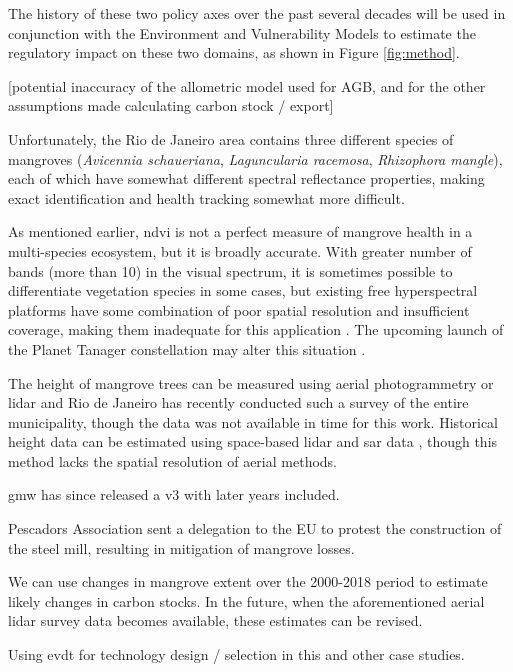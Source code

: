 The history of these two policy axes over the past several decades will be used in conjunction with the Environment and Vulnerability Models to estimate the regulatory impact on these two domains, as shown in Figure \ref{fig:method}.

[potential inaccuracy of the allometric model used for AGB, and for the other assumptions made calculating carbon stock / export]


Unfortunately, the Rio de Janeiro area contains three different species of mangroves (\textit{Avicennia schaueriana}, \textit{Laguncularia racemosa}, \textit{Rhizophora mangle}), each of which have somewhat different spectral reflectance properties, making exact identification and health tracking somewhat more difficult.

As mentioned earlier, \ac{ndvi} is not a perfect measure of mangrove health in a multi-species ecosystem, but it is broadly accurate. With greater number of bands (more than 10) in the visual spectrum, it is sometimes possible to differentiate vegetation species in some cases, but existing free hyperspectral platforms have some combination of poor spatial resolution and insufficient coverage, making them inadequate for this application \cite{mousivandGlobalSensitivityAnalysis2014}. The upcoming launch of the Planet Tanager constellation may alter this situation \cite{planetlabspbcPlanetAnnouncesNew2022}.

The height of mangrove trees can be measured using aerial photogrammetry or \ac{lidar} \cite{olagokeIndividualMangroveTree2015} and Rio de Janeiro has recently conducted such a survey of the entire municipality, though the data was not available in time for this work. Historical height data can be estimated using space-based \ac{lidar} and \ac{sar} data \cite{lagomasinoComparisonMangroveCanopy2016}, though this method lacks the spatial resolution of aerial methods.

\ac{gmw} has since released a v3 with later years included.

Pescadors Association sent a delegation to the EU to protest the construction of the steel mill, resulting in mitigation of mangrove losses. 

We can use changes in mangrove extent over the 2000-2018 period to estimate likely changes in carbon stocks. In the future, when the aforementioned aerial \ac{lidar} survey data becomes available, these estimates can be revised.

Using evdt for technology design / selection in this and other case studies.

